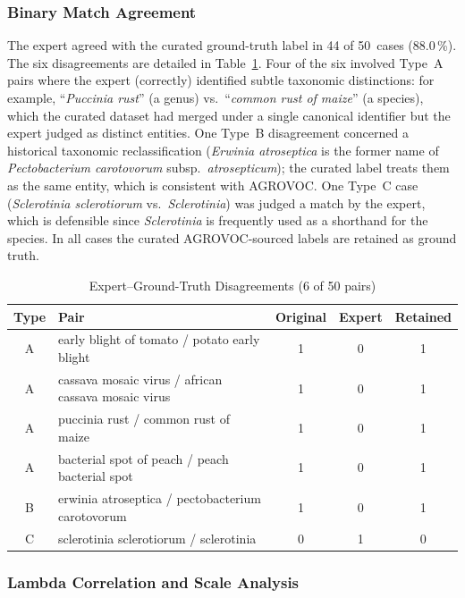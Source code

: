\subsubsection{Binary Match Agreement}

The expert agreed with the curated ground-truth label in 44 of
50~cases (88.0\,\%). The six disagreements are detailed in
Table~\ref{tab:expert_disagree}. Four of the six involved Type~A
pairs where the expert (correctly) identified subtle taxonomic
distinctions: for example, ``\emph{Puccinia rust}'' (a genus) vs.\
``\emph{common rust of maize}'' (a species), which the curated dataset
had merged under a single canonical identifier but the expert judged
as distinct entities. One Type~B disagreement concerned a historical
taxonomic reclassification (\emph{Erwinia atroseptica} is the former
name of \emph{Pectobacterium carotovorum} subsp.\ \emph{atrosepticum});
the curated label treats them as the same entity, which is consistent
with AGROVOC. One Type~C case (\emph{Sclerotinia sclerotiorum} vs.\
\emph{Sclerotinia}) was judged a match by the expert, which is
defensible since \emph{Sclerotinia} is frequently used as a shorthand
for the species. In all cases the curated AGROVOC-sourced labels are
retained as ground truth.

\begin{table}[h]
\caption{Expert--Ground-Truth Disagreements (6 of 50 pairs)}
\label{tab:expert_disagree}
\centering
\small
\begin{tabular}{clccc}
\toprule
\textbf{Type} & \textbf{Pair} & \textbf{Original} & \textbf{Expert} & \textbf{Retained} \\
\midrule
A & early blight of tomato / potato early blight        & 1 & 0 & 1 \\
A & cassava mosaic virus / african cassava mosaic virus  & 1 & 0 & 1 \\
A & puccinia rust / common rust of maize                & 1 & 0 & 1 \\
A & bacterial spot of peach / peach bacterial spot      & 1 & 0 & 1 \\
B & erwinia atroseptica / pectobacterium carotovorum     & 1 & 0 & 1 \\
C & sclerotinia sclerotiorum / sclerotinia               & 0 & 1 & 0 \\
\bottomrule
\end{tabular}
\end{table}

\subsubsection{Lambda Correlation and Scale Analysis}

